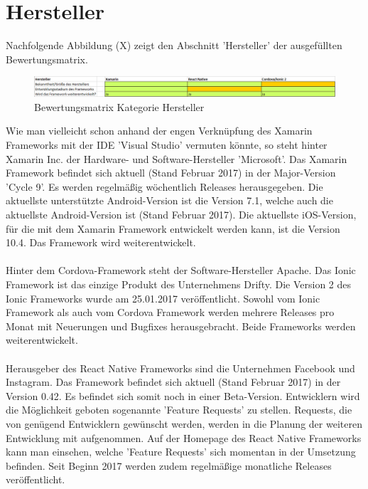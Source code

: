 \section{Hersteller}

Nachfolgende Abbildung (X) zeigt den Abschnitt 'Hersteller' der ausgefüllten Bewertungsmatrix.

\begin{figure}[h]
	\centering
	\includegraphics[width=1\textwidth]{Bilder/Auswertung_Hersteller.PNG}
	\caption{Bewertungsmatrix Kategorie Hersteller}
	\label{fig:AuswHerst}
\end{figure}

Wie man vielleicht schon anhand der engen Verknüpfung des Xamarin Frameworks mit der IDE 'Visual Studio' vermuten könnte, so steht hinter Xamarin Inc. der Hardware- und Software-Hersteller 'Microsoft'. Das Xamarin Framework befindet sich aktuell (Stand Februar 2017) in der Major-Version 'Cycle 9'. Es werden regelmäßig wöchentlich Releases herausgegeben. Die aktuellste unterstützte Android-Version ist die Version 7.1, welche auch die aktuellste Android-Version ist (Stand Februar 2017). Die aktuellste iOS-Version, für die mit dem Xamarin Framework entwickelt werden kann, ist die Version 10.4. Das Framework wird weiterentwickelt. 
\\
\\
Hinter dem Cordova-Framework steht der Software-Hersteller Apache. Das Ionic Framework ist das einzige Produkt des Unternehmens Drifty. Die Version 2 des Ionic Frameworks wurde am 25.01.2017 veröffentlicht. Sowohl vom Ionic Framework als auch vom Cordova Framework werden mehrere Releases pro Monat mit Neuerungen und Bugfixes herausgebracht. Beide Frameworks werden weiterentwickelt. 
\\
\\ 
Herausgeber des React Native Frameworks sind die Unternehmen Facebook und Instagram. Das Framework befindet sich aktuell (Stand Februar 2017) in der Version 0.42. Es befindet sich somit noch in einer Beta-Version. Entwicklern wird die Möglichkeit geboten sogenannte 'Feature Requests' zu stellen. Requests, die von genügend Entwicklern gewünscht werden, werden in die Planung der weiteren Entwicklung mit aufgenommen. Auf der Homepage des React Native Frameworks kann man einsehen, welche 'Feature Requests' sich momentan in der Umsetzung befinden. Seit Beginn 2017 werden zudem regelmäßige monatliche Releases veröffentlicht. 

